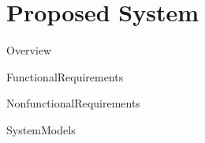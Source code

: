 \chapter{Proposed System}

{Overview}

{FunctionalRequirements}

{NonfunctionalRequirements}

{SystemModels}

